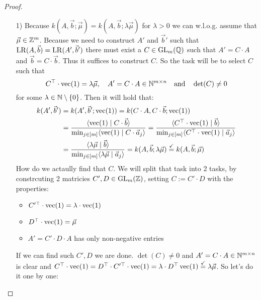 \begin{proof}
    \begin{enumerate}
        \item[1)] Because $k(A, \vec b; \vec \mu) = k(A, \vec b; \lambda \vec \mu)$ for $\lambda > 0$ we can w.l.o.g. assume that $\vec \mu \in \mathbb{Z}^m$. Because we need to construct $A'$ and $\vec b'$ such that $\operatorname{LR}(A, \vec b) = \operatorname{LR}(A', \vec b')$ there must exist a $C \in \operatorname{GL}_m(\mathbb{Q})$ such that $A' = C\cdot A$ and $\vec b = C\cdot \vec b$. Thus it suffices to construct $C$. So the task will be to select $C$ such that
        $$C^\top \cdot \operatorname{vec}(1) = \lambda \vec\mu, \quad A' = C\cdot A \in \mathbb{N}^{m \times n} \quad \textrm{and} \quad \det(C) \neq 0$$
        for some $\lambda \in \mathbb{N} \setminus \{0\}$. Then it will hold that:
        \begin{align*}
            k(A', \vec b') &= k(A', \vec b'; \operatorname{vec}(1)) = k(C \cdot A, C \cdot \vec b; \operatorname{vec}(1))\\
            &= \frac{\langle \operatorname{vec}(1) \mid C \cdot \vec b \rangle}{\min_{j \in [m]} \langle \operatorname{vec}(1) \mid C \cdot \vec a_j \rangle} = \frac{\langle C^\top \cdot \operatorname{vec}(1) \mid \vec b \rangle}{\min_{j \in [m]} \langle C^\top \cdot \operatorname{vec}(1) \mid \vec a_j \rangle}\\
            &= \frac{\langle \lambda\vec{\mu} \mid \vec b \rangle}{\min_{j \in [m]} \langle \lambda\vec \mu \mid \vec a_j \rangle} = k(A, \vec b; \lambda\vec\mu) \stackrel{\checkmark}{=} k(A, \vec b; \vec\mu)
        \end{align*}
        How do we actaully find that $C$. We will split that task into 2 tasks, by constrcuting 2 matricies $C', D  \in \operatorname{GL}_m(\mathbb{Z})$, setting $C := C' \cdot D$ with the properties:
        \begin{itemize}
            \item $C'^\top \cdot \operatorname{vec}(1) = \lambda \cdot \operatorname{vec}(1)$
            \item $D^\top \cdot \operatorname{vec}(1) = \vec\mu$
            \item $A' = C' \cdot D\cdot A$ has only non-negative entries
        \end{itemize}
        If we can find such $C', D$ we are done. $\det(C) \neq 0$ and $ A' = C\cdot A \in \mathbb{N}^{m \times n}$ is clear and $C^\top \cdot \operatorname{vec}(1) = D^\top \cdot C'^\top\cdot \operatorname{vec}(1) = \lambda \cdot D^\top \operatorname{vec}(1) \stackrel{\checkmark}{=}\lambda\vec\mu$. So let's do it one by one:


\end{enumerate}
\end{proof}
